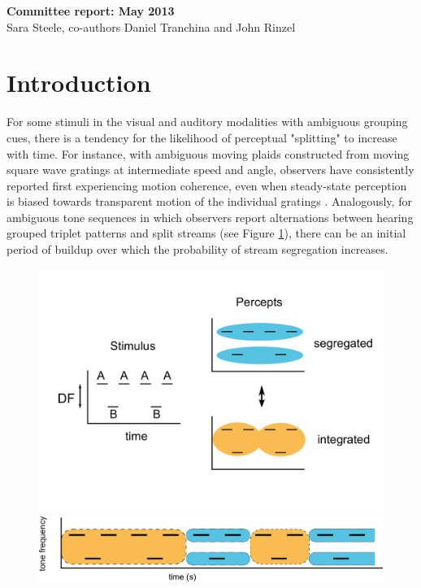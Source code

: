 \documentclass[10pt]{article}
\date{}
\begin{document}
\begin{flushleft}
{\Large
\textbf{Committee report: May 2013}
}
\\
Sara Steele, co-authors Daniel Tranchina and John Rinzel
\end{flushleft}

\section*{Introduction}
For some stimuli in the visual and auditory modalities with ambiguous grouping cues, there is a tendency for the likelihood of perceptual "splitting" to increase with time. For instance, with ambiguous moving plaids constructed from moving square wave gratings at intermediate speed and angle, observers have consistently reported first experiencing motion coherence, even when steady-state perception is biased towards transparent motion of the individual gratings \cite{Rubin2004}. Analogously, for ambiguous tone sequences in which observers report alternations between hearing grouped triplet patterns and split streams \cite{Noorden1975} (see Figure \ref{fig:percepts_timecourse}), there can be an initial period of buildup over which the probability of stream segregation increases. 

\newpage
\begin{figure}[scale = 0.6]
	\centering
	\includegraphics[scale=0.35]{../aba_stimulus-percepts}
	\includegraphics[scale=0.45]{../percepts_timecourse}
	\caption{}
	\label{fig:percepts_timecourse}
\end{figure}
\end{document}
